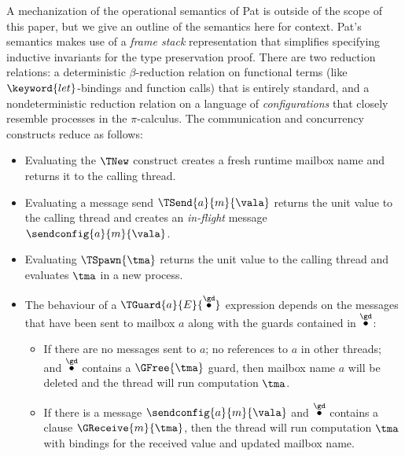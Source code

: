 

A mechanization of the operational semantics of Pat is outside of the scope of
this paper, but we give an outline of the semantics here for context.
Pat's semantics makes use of a \emph{frame stack}
representation that simplifies specifying inductive invariants for the type
preservation proof.
There are two reduction relations: a deterministic
$\beta$-reduction relation on functional terms (like $\keyword{let}$-bindings
and function calls) that is entirely standard, and a nondeterministic reduction
relation on a language of \emph{configurations} that closely resemble processes
in the $\pi$-calculus. The communication and concurrency constructs reduce as
follows:

\begin{itemize}
    \item Evaluating the $\TNew$ construct creates a fresh runtime mailbox name and returns
        it to the calling thread.
    \item Evaluating a message send $\TSend{a}{m}{\vala}$ returns the unit value
        to the calling thread and creates an \emph{in-flight} message
        $\sendconfig{a}{m}{\vala}$.
    \item Evaluating $\TSpawn{\tma}$ returns the unit value to the calling
        thread and evaluates $\tma$ in a new process.
    \item The behaviour of a $\TGuard{a}{E}{\seq{\gd}}$ expression depends on
        the messages that have been sent to mailbox $a$ along with the guards
        contained in $\seq{\gd}$:
        \begin{itemize}
            \item If there are no messages sent to $a$; no references to $a$
                in other threads; and $\seq{\gd}$ contains a $\GFree{\tma}$
                guard, then mailbox name $a$ will be deleted and the thread will
                run computation $\tma$.
            \item If there is a message $\sendconfig{a}{m}{\vala}$ and
                $\seq{\gd}$ contains a clause $\GReceive{m}{\tma}$, then
                the thread will run computation $\tma$ with bindings for the
                received value and updated mailbox name.
    \end{itemize}
\end{itemize}


